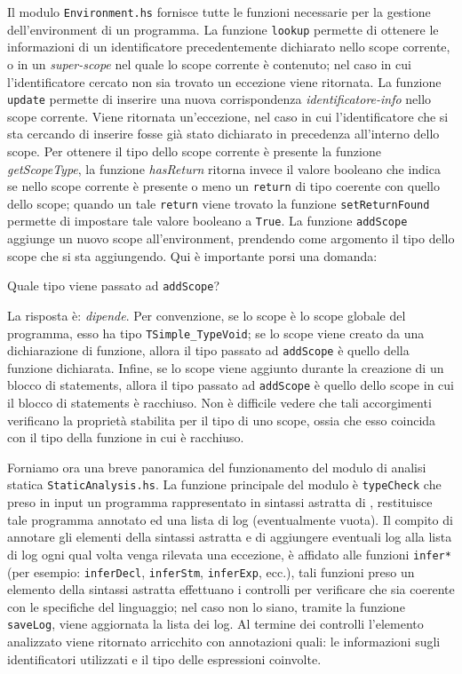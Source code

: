 Il modulo \texttt{Environment.hs} fornisce tutte le funzioni necessarie per la gestione dell'environment di un programma. La funzione \texttt{lookup}  permette di ottenere le informazioni di un identificatore precedentemente dichiarato nello scope corrente, o in un \textit{super-scope} nel quale lo scope corrente è contenuto; nel caso in cui l'identificatore cercato non sia trovato un eccezione viene ritornata.
La funzione \texttt{update} permette di inserire una nuova corrispondenza \textit{identificatore-info} nello scope corrente. Viene ritornata un'eccezione, nel caso in cui l'identificatore che si sta cercando di inserire fosse già stato dichiarato in precedenza all'interno dello scope.
Per ottenere il tipo dello scope corrente è presente la funzione \textit{getScopeType}, la funzione \textit{hasReturn} ritorna invece il valore booleano che indica se nello scope corrente è presente o meno un \texttt{return} di tipo coerente con quello dello scope; quando un tale \texttt{return} viene trovato la funzione \texttt{setReturnFound} permette di impostare tale valore booleano a \texttt{True}.
La funzione \texttt{addScope} aggiunge un nuovo scope all'environment, prendendo come argomento il tipo dello scope che si sta aggiungendo. Qui è importante porsi una domanda:
\begin{center}
Quale tipo viene passato ad \texttt{addScope}?
\end{center}
La risposta è: \textit{dipende}. 
Per convenzione, se lo scope è lo scope globale del programma, esso ha tipo \texttt{TSimple\_TypeVoid}; se lo scope viene creato da una dichiarazione di funzione, allora il tipo passato ad \texttt{addScope} è quello della funzione dichiarata. Infine, se lo scope viene aggiunto durante la creazione di un blocco di statements, allora il tipo passato ad \texttt{addScope} è quello dello scope in cui il blocco di statements è racchiuso.
Non è difficile vedere che tali accorgimenti verificano la proprietà stabilita per il tipo di uno scope, ossia che esso coincida con il tipo della funzione in cui è racchiuso.

Forniamo ora una breve panoramica del funzionamento del modulo di analisi statica \texttt{StaticAnalysis.hs}. La funzione principale del modulo è \texttt{typeCheck} che preso in input un programma rappresentato in sintassi astratta di \SBF, restituisce tale programma annotato ed una lista di log (eventualmente vuota).
Il compito di annotare gli elementi della sintassi astratta e di aggiungere eventuali log alla lista di log ogni qual volta venga rilevata una eccezione, è affidato alle funzioni \texttt{infer*} (per esempio: \texttt{inferDecl}, \texttt{inferStm}, \texttt{inferExp}, ecc.), tali funzioni preso un elemento della sintassi astratta effettuano i controlli per verificare che sia coerente con le specifiche del linguaggio; nel caso non lo siano, tramite la funzione \texttt{saveLog}, viene aggiornata la lista dei log. Al termine dei controlli l'elemento analizzato viene ritornato arricchito con annotazioni quali: le informazioni sugli identificatori utilizzati e il tipo delle espressioni coinvolte. 

